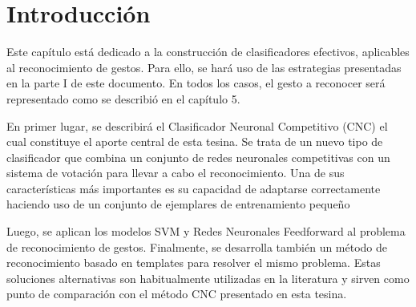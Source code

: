 

\section{Introducción}

Este capítulo está dedicado a la construcción de clasificadores efectivos, aplicables al reconocimiento de gestos. Para ello, se hará uso de las estrategias presentadas en la parte I de este documento. En todos los casos, el gesto a reconocer será representado como se describió en el capítulo 5.


%
%

En primer lugar, se describirá el Clasificador Neuronal Competitivo (CNC) el cual constituye el aporte central de esta tesina. Se trata de un nuevo tipo de clasificador que combina un conjunto de  redes neuronales competitivas con un sistema de votación para llevar a cabo el reconocimiento. Una de sus características más importantes es su capacidad de adaptarse correctamente haciendo uso de un conjunto de ejemplares de entrenamiento pequeño

Luego, se aplican los modelos SVM y Redes Neuronales Feedforward al problema de reconocimiento de gestos. Finalmente, se desarrolla también un método de reconocimiento basado en templates para resolver el mismo problema. Estas soluciones alternativas son habitualmente utilizadas en la literatura \cite{yun2009automatic, Patsadu2012,celebi2013gesture} y sirven como punto de comparación con el método CNC presentado en esta tesina. 


